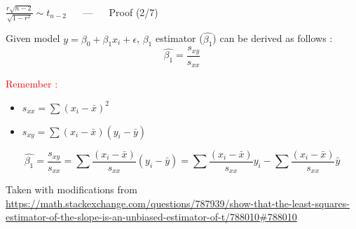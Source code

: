 \documentclass{beamer}
\begin{document}
\begin{frame}
{\centerline{$ \frac{r\sqrt{n-2}}{\sqrt{1-r^2}} \sim t_{n-2} $  ~~ --- ~~ Proof (2/7)}}

Given model $y = \beta_0 + \beta_1 x_i + \epsilon$, $\beta_1$ estimator ($\hat{\beta_1}$) can be derived as follows :
$$\hat{\beta_1} = \frac{s_{xy}}{s_{xx}}$$

\textcolor{red}{Remember : }
\begin{itemize}
\setlength\itemsep{0.8em}
\item $s_{xx} = \sum \left ( x_i - \bar{x} \right )^{2} $
\item $s_{xy} = \sum \left ( x_i - \bar{x} \right ) \left ( y_i - \bar{y} \right ) $
\end{itemize}

$$\hat{\beta_1} = \frac{s_{xy}}{s_{xx}} = \sum \frac{(x_i - \bar{x})}{s_{xx}} \left ( y_i - \bar{y} \right ) = \sum \frac{(x_i - \bar{x})}{s_{xx}} y_i  - \sum \frac{(x_i - \bar{x})}{s_{xx}} \bar{y}$$

\begin{center}
\tiny{Taken with modifications from \url{https://math.stackexchange.com/questions/787939/show-that-the-least-squares-estimator-of-the-slope-is-an-unbiased-estimator-of-t/788010\#788010}}
\end{center}
\end{frame}
\end{document}
